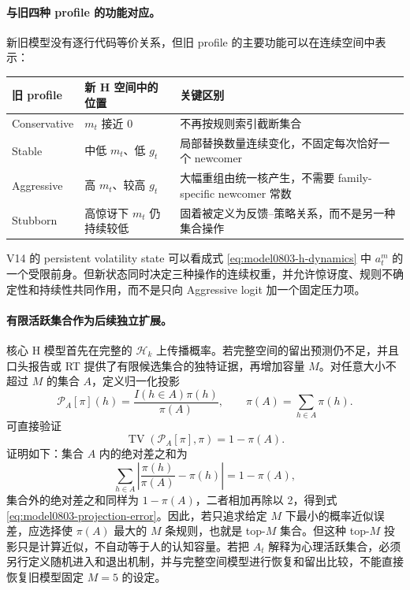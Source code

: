 \paragraph{与旧四种 profile 的功能对应。}
新旧模型没有逐行代码等价关系，但旧 profile 的主要功能可以在连续空间中表示：
\begin{center}
\small
\begin{tabular}{p{}|p{}|p{}}
\hline
旧 profile & 新 H 空间中的位置 & 关键区别\\
\hline
Conservative & $m_t$ 接近 0 & 不再按规则索引截断集合\\
Stable & 中低 $m_t$、低 $g_t$ & 局部替换数量连续变化，不固定每次恰好一个 newcomer\\
Aggressive & 高 $m_t$、较高 $g_t$ & 大幅重组由统一核产生，不需要 family-specific newcomer 常数\\
Stubborn & 高惊讶下 $m_t$ 仍持续较低 & 固着被定义为反馈--策略关系，而不是另一种集合操作\\
\hline
\end{tabular}
\normalsize
\end{center}
V14 的 persistent volatility state 可以看成式 \ref{eq:model0803-h-dynamics} 中 $a^m_t$ 的一个受限前身。但新状态同时决定三种操作的连续权重，并允许惊讶度、规则不确定性和持续性共同作用，而不是只向 Aggressive logit 加一个固定压力项。

\paragraph{有限活跃集合作为后续独立扩展。}
核心 H 模型首先在完整的 $\mathcal H_k$ 上传播概率。若完整空间的留出预测仍不足，并且口头报告或 RT 提供了有限候选集合的独特证据，再增加容量 $M$。对任意大小不超过 $M$ 的集合 $A$，定义归一化投影
\begin{equation}
    \mathcal P_A[\pi](h)
    =\frac{I(h\in A)\pi(h)}{\pi(A)},
    \qquad
    \pi(A)=\sum_{h\in A}\pi(h).
    \label{eq:model0803-capacity-projection}
\end{equation}
可直接验证
\begin{equation}
    \operatorname{TV}(\mathcal P_A[\pi],\pi)
    =1-\pi(A).
    \label{eq:model0803-projection-error}
\end{equation}
证明如下：集合 $A$ 内的绝对差之和为
\begin{equation}
    \sum_{h\in A}
    \left|\frac{\pi(h)}{\pi(A)}-\pi(h)\right|
    =1-\pi(A),
\end{equation}
集合外的绝对差之和同样为 $1-\pi(A)$，二者相加再除以 2，得到式 \ref{eq:model0803-projection-error}。因此，若只追求给定 $M$ 下最小的概率近似误差，应选择使 $\pi(A)$ 最大的 $M$ 条规则，也就是 top-$M$ 集合。但这种 top-$M$ 投影只是计算近似，不自动等于人的认知容量。若把 $A_t$ 解释为心理活跃集合，必须另行定义随机进入和退出机制，并与完整空间模型进行恢复和留出比较，不能直接恢复旧模型固定 $M=5$ 的设定。


